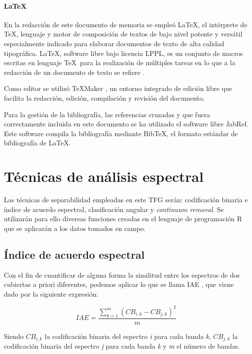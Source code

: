 \paragraph{\LaTeX}
En la redacción de este documento de memoria se empleó \LaTeX, el intérprete de \TeX, lenguaje y motor de composición de textos de bajo nivel potente y versátil especialmente indicado para elaborar documentos de texto de alta calidad tipográfica. \LaTeX, software libre bajo licencia LPPL, es un conjunto de macros escritas en lenguaje \TeX\ para la realización de múltiples tareas en lo que a la redacción de un documento de texto se refiere \citep{Latex2011} \citep{galindo2001} \citep{lamport1994}.\Sep

Como editor se utilizó TeXMaker \citep{Brachet2003}, un entorno integrado de edición libre que facilita la redacción, edición, compilación y revisión del documento.\Sep

Para la gestión de la bibliografía, las referencias cruzadas y que fuera correctamente incluida en este documento se ha utilizado el software libre JabRef. Este software compila la bibliografía mediante BibTeX, el formato estándar de bibliografía de \LaTeX.

\section{Técnicas de análisis espectral} \label{sec:tecnicas}
Las técnicas de separabilidad empleadas en este \ac{TFG} serán: codificación binaria e índice de acuerdo espectral, clasificación angular y \textit{continuum removal}. Se utilizarán para ello diversas funciones creadas en el lenguaje de programación R que se aplicarán a los datos tomados en campo.

\subsection{Índice de acuerdo espectral}
Con el fin de cuantificar de alguna forma la similitud entre los espectros de dos cubiertas a priori diferentes, podemos aplicar lo que se llama \ac{IAE} \citep{chuvieco2002teledeteccion}, que viene dado por la siguiente expresión:

\begin{equation} \label{eq:IAE}
	IAE = \frac{\displaystyle\sum_{k=1}^m(CB_{i,k} - CB_{j,k})^{2}}{m}
\end{equation}\Sep

Siendo $CB_{i,k}$ la codificación binaria del espectro \textit{i} para cada banda \textit{k}, $CB_{j,k}$ la codificación binaria del espectro \textit{j} para cada banda \textit{k} y \textit{m} el número de bandas.\Sep

